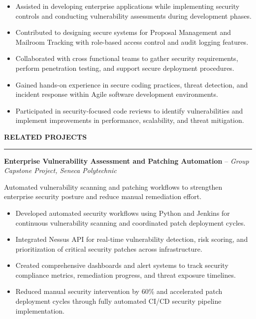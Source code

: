 \documentclass[10pt,letterpaper]{article}
\begin{document}
\begin{itemize}
\item Assisted in developing enterprise applications while implementing security controls and conducting vulnerability assessments during development phases.
\item Contributed to designing secure systems for Proposal Management and Mailroom Tracking with role-based access control and audit logging features.
\item Collaborated with cross functional teams to gather security requirements, perform penetration testing, and support secure deployment procedures.
\item Gained hands-on experience in secure coding practices, threat detection, and incident response within Agile software development environments.
\item Participated in security-focused code reviews to identify vulnerabilities and implement improvements in performance, scalability, and threat mitigation.
\end{itemize}

\vspace{6pt}

\textbf{RELATED PROJECTS}\\[-8pt]
\noindent\rule{\textwidth}{1pt}

\vspace{-2pt}

\textbf{Enterprise Vulnerability Assessment and Patching Automation} -- \emph{Group Capstone Project, Seneca Polytechnic}

\vspace{-1pt}

Automated vulnerability scanning and patching workflows to strengthen enterprise security posture and reduce manual remediation effort.
\vspace{-1pt}
\begin{itemize}
\item Developed automated security workflows using Python and Jenkins for continuous vulnerability scanning and coordinated patch deployment cycles.
\item Integrated Nessus API for real-time vulnerability detection, risk scoring, and prioritization of critical security patches across infrastructure.
\item Created comprehensive dashboards and alert systems to track security compliance metrics, remediation progress, and threat exposure timelines.
\item Reduced manual security intervention by 60\% and accelerated patch deployment cycles through fully automated CI/CD security pipeline implementation.
\end{itemize}
\end{document}
